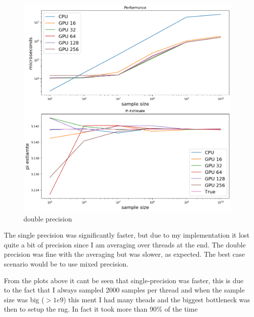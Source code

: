\documentclass{article}
\begin{document}
\begin{figure}[H]
  \centering
  \includegraphics[width=0.95\linewidth]{ex_4/pi-double-cpu-vs-gpu.png}
  \caption{double precision}
  \label{fig:}
\end{figure}


The single precision was significantly faster, but due to my implementation it lost quite a bit of precision since I am averaging over threads at the end. The
double precision was fine with the averaging but was slower, as expected. The best case scenario would be to use mixed precision.

From the plots above it cant be seen that single-precision was faster, this is due to the fact that I always sampled 2000 samples per thread and when the sample
size was big ($> 1e9$) this ment I had many theads and the biggest bottleneck was then to setup the rng. In fact it took more than 90\% of the time
\end{document}

